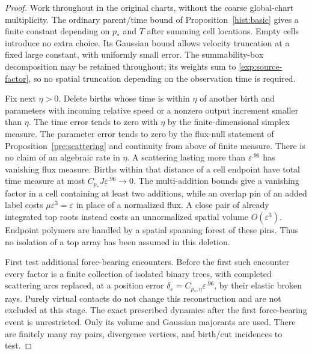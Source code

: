 \begin{proof}
Work throughout in the original charts, without the coarse global-chart
multiplicity.  The ordinary parent/time bound of Proposition~\ref{hist:basic}
gives a finite constant depending on $p_*$ and $T$ after summing cell
locations.  Empty cells introduce no extra choice.  Its Gaussian bound
allows velocity truncation at a fixed large constant, with uniformly small
error.  The summability-box decomposition may be retained throughout;
its weights sum to \eqref{exp:source-factor}, so no spatial truncation
depending on the observation time is required.

Fix next $\eta>0$.  Delete births whose time is within $\eta$ of another
birth and parameters with incoming relative speed or a nonzero output
increment smaller than $\eta$.  The time error tends to zero with $\eta$
by the finite-dimensional simplex measure.  The parameter error tends to
zero by the flux-null statement of Proposition~\ref{pre:scattering} and
continuity from above of finite measure.  There is no claim of an
algebraic rate in $\eta$.  A scattering lasting more than
$\varepsilon^{.96}$ has vanishing flux measure.  Births within that distance
of a cell endpoint have total time measure at most
$C_{p_*}J\varepsilon^{.96}\to0$.  The multi-addition bounds give a vanishing
factor in a cell containing at least two additions, while an overlap pin
of an added label costs $\mu\varepsilon^3=\varepsilon$ in place of a
normalized flux.  A close pair of already integrated top roots instead
costs an unnormalized spatial volume $O(\varepsilon^3)$.  Endpoint polymers
are handled by a spatial spanning forest of these pins.  Thus no isolation
of a top array has been assumed in this deletion.

First test additional force-bearing encounters.  Before the first such
encounter every factor is a finite collection of isolated binary trees, with completed scattering arcs
replaced, at a position error
$\delta_\varepsilon=C_{p_*,\eta}\varepsilon^{.96}$, by their elastic broken
rays.  Purely virtual contacts do not change this reconstruction and are not
excluded at this stage.  The exact prescribed dynamics after the first
force-bearing event is unrestricted.
Only its volume and Gaussian majorants are used.  There are finitely many
ray pairs, divergence vertices, and birth/cut incidences to test.


\end{proof}
